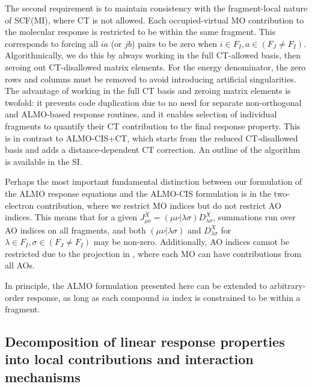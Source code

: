 The second requirement is to maintain consistency with the fragment-local nature of SCF(MI), where CT is not allowed. Each occupied-virtual MO contribution to the molecular response is restricted to be within the same fragment. This corresponds to forcing all \(ia\) (or \(jb\)) pairs to be zero when \(i \in F_{I}, a \in (F_{J} \neq F_{I})\). Algorithmically, we do this by always working in the full CT-allowed basis, then zeroing out CT-disallowed matrix elements. For the energy denominator, the zero rows and columns must be removed to avoid introducing artificial singularities. The advantage of working in the full CT basis and zeroing matrix elements is twofold: it prevents code duplication due to no need for separate non-orthogonal and ALMO-based response routines, and it enables selection of individual fragments to quantify their CT contribution to the final response property. This is in contrast to ALMO-CIS+CT\cite{Ge_2017_44111}, which starts from the reduced CT-disallowed basis and adds a distance-dependent CT correction. An outline of the algorithm is available in the SI.

Perhaps the most important fundamental distinction between our formulation of the ALMO response equations and the ALMO-CIS formulation is in the two-electron contribution, where we restrict MO indices but do not restrict AO indices. This means that for a given \(J_{\mu\nu}^{X} = (\mu\nu|\lambda\sigma)D_{\lambda\sigma}^{X}\), summations run over AO indices on all fragments, and both \((\mu\nu|\lambda\sigma)\) and \(D_{\lambda\sigma}^{X}\) for \(\lambda\in F_{I}, \sigma\in (F_{J} \neq F_{I})\) may be non-zero. Additionally, AO indices cannot be restricted due to the projection in , where each MO can have contributions from all AOs.

In principle, the ALMO formulation presented here can be extended to arbitrary-order response, as long as each compound \(ia\) index is constrained to be within a fragment.

\subsection{Decomposition of linear response properties into local contributions and interaction mechanisms}
\label{ssec:decomp-line-resp}

